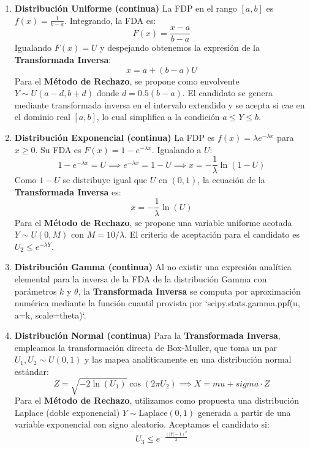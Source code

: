 \documentclass{article}
\begin{document}
\begin{enumerate}
    \item \textbf{Distribución Uniforme (continua)}
    La FDP en el rango $[a, b]$ es $f(x) = \frac{1}{b-a}$. Integrando, la FDA es:
    \begin{equation}
    F(x) = \frac{x-a}{b-a}
    \end{equation}
    Igualando $F(x) = U$ y despejando obtenemos la expresión de la \textbf{Transformada Inversa}:
    \begin{equation}
    x = a + (b-a)U
    \end{equation}
    Para el \textbf{Método de Rechazo}, se propone como envolvente $Y \sim U(a - d, b + d)$ donde $d = 0.5(b-a)$. El candidato se genera mediante transformada inversa en el intervalo extendido y se acepta si cae en el dominio real $[a, b]$, lo cual simplifica a la condición $a \le Y \le b$.

    \item \textbf{Distribución Exponencial (continua)}
    La FDP es $f(x) = \lambda e^{-\lambda x}$ para $x \ge 0$. Su FDA es $F(x) = 1 - e^{-\lambda x}$. Igualando a $U$:
    \begin{equation}
    1 - e^{-\lambda x} = U \implies e^{-\lambda x} = 1 - U \implies x = -\frac{1}{\lambda} \ln(1-U)
    \end{equation}
    Como $1-U$ se distribuye igual que $U$ en $(0,1)$, la ecuación de la \textbf{Transformada Inversa} es:
    \begin{equation}
    x = -\frac{1}{\lambda} \ln(U)
    \end{equation}
    Para el \textbf{Método de Rechazo}, se propone una variable uniforme acotada $Y \sim U(0, M)$ con $M = 10/\lambda$. El criterio de aceptación para el candidato es $U_2 \le e^{-\lambda Y}$.

    \item \textbf{Distribución Gamma (continua)}
    Al no existir una expresión analítica elemental para la inversa de la FDA de la distribución Gamma con parámetros $k$ y $\theta$, la \textbf{Transformada Inversa} se computa por aproximación numérica mediante la función cuantil provista por `scipy.stats.gamma.ppf(u, a=k, scale=theta)`.

    \item \textbf{Distribución Normal (continua)}
    Para la \textbf{Transformada Inversa}, empleamos la transformación directa de Box-Muller, que toma un par $U_1, U_2 \sim U(0,1)$ y las mapea analíticamente en una distribución normal estándar:
    \begin{equation}
    Z = \sqrt{-2\ln(U_1)} \cos(2\pi U_2) \implies X = mu + sigma \cdot Z
    \end{equation}
    Para el \textbf{Método de Rechazo}, utilizamos como propuesta una distribución Laplace (doble exponencial) $Y \sim \text{Laplace}(0,1)$ generada a partir de una variable exponencial con signo aleatorio. Aceptamos el candidato si:
    \begin{equation}
    U_3 \le e^{-\frac{(|Y| - 1)^2}{2}}
    \end{equation}


\end{enumerate}
\end{document}
